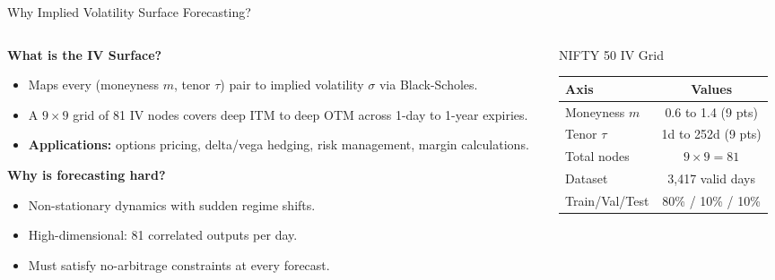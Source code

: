 \documentclass[aspectratio=169,10pt]{beamer}
\begin{document}
\begin{frame}{Why Implied Volatility Surface Forecasting?}
  \begin{columns}[T]
    \begin{column}{0.54\textwidth}
      \textbf{What is the IV Surface?}
      \begin{itemize}\itemsep3pt
        \item Maps every (moneyness $m$, tenor $\tau$) pair to implied volatility $\sigma$ via Black-Scholes.
        \item A $9{\times}9$ grid of 81 IV nodes covers deep ITM to deep OTM across 1-day to 1-year expiries.
        \item \textbf{Applications:} options pricing, delta/vega hedging, risk management, margin calculations.
      \end{itemize}
      \vspace{4pt}
      \textbf{Why is forecasting hard?}
      \begin{itemize}\itemsep3pt
        \item Non-stationary dynamics with sudden regime shifts.
        \item High-dimensional: 81 correlated outputs per day.
        \item Must satisfy \alert{no-arbitrage} constraints at every forecast.
      \end{itemize}
    \end{column}
    \begin{column}{0.43\textwidth}
      \begin{block}{NIFTY 50 IV Grid}
        \centering\footnotesize
        \begin{tabular}{lc}
          \toprule
          \textbf{Axis} & \textbf{Values} \\
          \midrule
          Moneyness $m$ & 0.6 to 1.4 (9 pts) \\
          Tenor $\tau$  & 1d to 252d (9 pts) \\
          Total nodes   & $9\times9=81$ \\
          Dataset       & 3,417 valid days \\
          Train/Val/Test & 80\% / 10\% / 10\% \\
          \bottomrule
        \end{tabular}
      \end{block}
    \end{column}
  \end{columns}
\end{frame}
\end{document}

